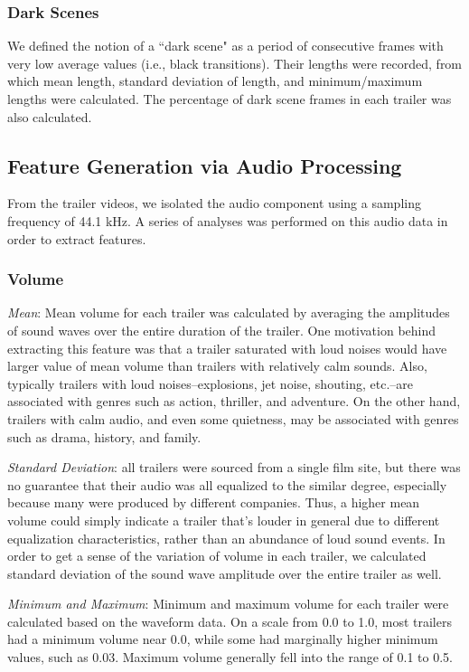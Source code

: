 \documentclass[letterpaper, 10 pt, conference]{ieeeconf}  %
\begin{document}
\subsubsection{Dark Scenes}
We defined the notion of a ``dark scene" as a period of consecutive frames with very low average values (i.e., black transitions). Their lengths were recorded, from which mean length, standard deviation of length, and minimum/maximum lengths were calculated. The percentage of dark scene frames in each trailer was also calculated. 

\subsection{Feature Generation via Audio Processing}
From the trailer videos, we isolated the audio component using a sampling frequency of 44.1 kHz. A series of analyses was performed on this audio data in order to extract features.

\subsubsection{Volume}
\textit{Mean}: Mean volume for each trailer was calculated by averaging the amplitudes of sound waves over the entire duration of the trailer. One motivation behind extracting this feature was that a trailer saturated with loud noises would have larger value of mean volume than trailers with relatively calm sounds. Also, typically trailers with loud noises--explosions, jet noise, shouting, etc.--are associated with genres such as action, thriller, and adventure. On the other hand, trailers with calm audio, and even some quietness, may be associated with genres such as drama, history, and family.

\textit{Standard Deviation}: all trailers were sourced from a single film site, but there was no guarantee that their audio was all equalized to the similar degree, especially because many were produced by different companies. Thus, a higher mean volume could simply indicate a trailer that's louder in general due to different equalization characteristics, rather than an abundance of loud sound events. In order to get a sense of the variation of volume in each trailer, we calculated standard deviation of the sound wave amplitude over the entire trailer as well.

\textit{Minimum and Maximum}: Minimum and maximum volume for each trailer were calculated based on the waveform data. On a scale from 0.0 to 1.0, most trailers had a minimum volume near 0.0, while some had marginally higher minimum values, such as 0.03. Maximum volume generally fell into the range of 0.1 to 0.5.
\end{document}

